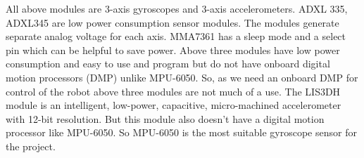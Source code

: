 \documentclass[a4paper,11pt,twocolumn]{article}
\begin{document}
	
All above modules are 3-axis gyroscopes and 3-axis accelerometers. ADXL 335, ADXL345 are low power consumption sensor modules. The modules generate separate analog voltage for each axis. MMA7361 has a sleep mode and a select pin which can be helpful to save power. Above three modules have low power consumption and easy to use and program but do not have  onboard digital motion processors (DMP) unlike MPU-6050. So, as we need an onboard DMP for control of the robot above three modules are not much of a use. The LIS3DH module is an intelligent, low-power, capacitive, micro-machined accelerometer with 12-bit resolution. But this module also doesn’t have a digital motion processor like MPU-6050. So MPU-6050 is the most suitable gyroscope sensor for the project\cite{noauthor_mpu-6050_nodate}.



\end{document}
